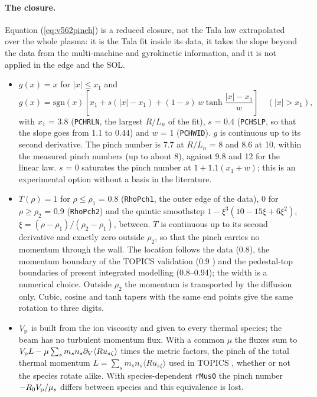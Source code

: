 \documentclass[11pt]{article}
\def\r#1{{\rm#1}}
\def\aves#1{\langle#1\rangle}
\begin{document}
\paragraph{The closure.}  Equation (\ref{eq:v562pinch}) is a reduced closure, not the
Tala law extrapolated over the whole plasma: it is the Tala fit inside its data, it
takes the slope beyond the data from the multi-machine and gyrokinetic information,
and it is not applied in the edge and the SOL.
\begin{itemize}
\item $g(x) = x$ for $|x|\le x_1$ and
\begin{equation}
  g(x) = \mathrm{sgn}(x)\left[x_1 + s(|x|-x_1) + (1-s)\,w\tanh\frac{|x|-x_1}{w}\right]
  \quad (|x|>x_1),
\end{equation}
with $x_1$ = 3.8 (\texttt{PCHRLN}, the largest $R/L_n$ of the fit), $s$ = 0.4
(\texttt{PCHSLP}, so that the slope goes from 1.1 to 0.44) and $w$ = 1 (\texttt{PCHWID}).
$g$ is continuous up to its second derivative.  The pinch number is 7.7 at $R/L_n$ = 8
and 8.6 at 10, within the measured pinch numbers (up to about 8), against 9.8 and 12 for
the linear law.  $s$ = 0 saturates the pinch number at $1+1.1(x_1+w)$; this is an
experimental option without a basis in the literature.
\item $T(\rho) = 1$ for $\rho\le\rho_1$ = 0.8 (\texttt{RhoPch1}, the outer edge of the
data), $0$ for $\rho\ge\rho_2$ = 0.9 (\texttt{RhoPch2}) and the quintic smoothstep
$1-\xi^3(10-15\xi+6\xi^2)$, $\xi=(\rho-\rho_1)/(\rho_2-\rho_1)$, between.  $T$ is
continuous up to its second derivative and exactly zero outside $\rho_2$, so that the
pinch carries no momentum through the wall.  The location follows the data
(0.8), the momentum boundary of the TOPICS validation (0.9 \cite{Honda2013}) and the
pedestal-top boundaries of present integrated modelling (0.8--0.94); the width is a
numerical choice.  Outside $\rho_2$ the momentum is transported by the diffusion only.
Cubic, cosine and tanh tapers with the same end points give the same rotation to three
digits.
\item $V_\r{p}$ is built from the ion viscosity and given to every thermal species; the
beam has no turbulent momentum flux.  With a common $\mu$ the fluxes sum to
$V_\r{p}L - \mu\sum_s m_sn_s\partial_V\aves{Ru_{s\zeta}}$ times the metric factors, the
pinch of the total thermal momentum $L = \sum_s m_sn_s\aves{Ru_{s\zeta}}$ used in
TOPICS \cite{Honda2013}, whether or not the species rotate alike.  With
species-dependent \texttt{rMus0} the pinch number $-R_0V_\r{p}/\mu_s$ differs between
species and this equivalence is lost.
\end{itemize}
\end{document}
